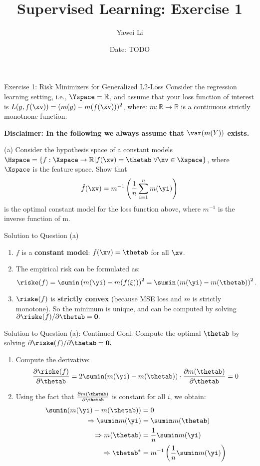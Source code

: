 \documentclass[aspectratio=169]{beamer}
\title[]{\textbf{Supervised Learning: Exercise 1}}
\author{Yawei Li}
\institute[LMU]
{
\\
  \texttt{yawei.li@stat.uni-muenchen.de}
}
\date{Date: TODO}
\begin{document}
\begin{frame}
\titlepage

\end{frame}

\begin{frame}{Exercise 1: Risk Minimizers for Generalized L2-Loss}
Consider the regression learning setting, i.e., $\Yspace = \mathbb{R}$, and assume that your loss function of interest is $L(y, f(\xv)) = (m(y) - m(f(\xv)))^2$, where: $m: \mathbb{R} \to \mathbb{R}$ is a continuous strictly monotnone function.

\textbf{Disclaimer: In the following we always assume that $\var(m(Y))$ exists.}

(a) Consider the hypothesis space of a constant models $\Hspace = \{f: \Xspace \rightarrow \mathbb{R} | f(\xv) = \thetab \ \forall \xv \in \Xspace \}$, where $\Xspace$ is the feature space. Show that 
$$
	\hat{f}(\xv) = m^{-1}\left( \frac{1}{n} \sum_{i=1}^n m(\yi) \right)
$$
is the optimal constant model for the loss function above, where $m^{-1}$ is the inverse function of m.
	
\end{frame}

\begin{frame}{Solution to Question (a)}
	\begin{enumerate}
		\item<1-> $f$ is a \textbf{constant model}: $f(\xv) = \thetab$ for all $\xv$.
		\item<2-> The empirical risk can be formulated as:
			$$\riske(f) = \sumin \left(m(\yi) - m(f(\xi)) \right)^2 = \sumin \left(m(\yi) - m(\thetab) \right)^2.$$
		\item<3-> $\riske(f)$ is \textbf{strictly convex} (because MSE loss and $m$ is strictly monotone). So the minimum is unique, and can be computed by solving $\partial{\riske(f)} / \partial \thetab = \bm{0}.$
	\end{enumerate}
\end{frame}

\begin{frame}{Solution to Question (a): Continued}
	Goal: Compute the optimal $\thetab$ by solving $\partial{\riske(f)} / \partial \thetab = \bm{0}.$
	
	\begin{enumerate}
		\small
		\item<1-> Compute the derivative: $$\frac{\partial \riske(f)}{\partial \thetab} = 2 \sumin (m(\yi) - m(\thetab)) \cdot \frac{\partial m(\thetab)}{\partial \thetab} = 0$$
		\item<2-> Using the fact that $\frac{\partial m(\thetab)}{\partial \thetab}$ is constant for all $i$, we obtain:
			\begin{align*}
				\sumin (m(\yi) - m(\thetab)) &= 0 \\
				\Rightarrow \sumin m(\yi) &= \sumin m(\thetab) \\
				\Rightarrow m(\thetab) &= \frac{1}{n} \sumin m(\yi) \\
				\Rightarrow \thetab^* &= m^{-1}\left(\frac{1}{n} \sumin m(\yi) \right)
			\end{align*}
	\end{enumerate}
\end{frame}
\end{document}

